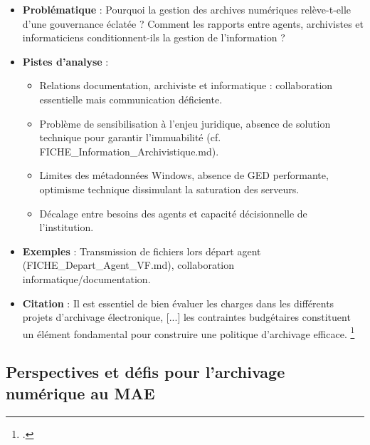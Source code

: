 \begin{itemize}
	\item \textbf{Problématique} : Pourquoi la gestion des archives numériques relève-t-elle d’une gouvernance éclatée ? Comment les rapports entre agents, archivistes et informaticiens conditionnent-ils la gestion de l’information ?
	\item \textbf{Pistes d’analyse} :
	\begin{itemize}
		\item Relations documentation, archiviste et informatique : collaboration essentielle mais communication déficiente.
		\item Problème de sensibilisation à l’enjeu juridique, absence de solution technique pour garantir l’immuabilité (cf. FICHE\_Information\_Archivistique.md).
		\item Limites des métadonnées Windows, absence de GED performante, optimisme technique dissimulant la saturation des serveurs.
		\item Décalage entre besoins des agents et capacité décisionnelle de l’institution.
	\end{itemize}
	\item \textbf{Exemples} : Transmission de fichiers lors départ agent (FICHE\_Depart\_Agent\_VF.md), collaboration informatique/documentation.
	\item \textbf{Citation} : \og Il est essentiel de bien évaluer les charges dans les différents projets d’archivage électronique, [...] les contraintes budgétaires constituent un élément fondamental pour construire une politique d’archivage efficace. \fg \footcite{bechardArchivesElectroniques2020a}
\end{itemize}

\subsection{Perspectives et défis pour l’archivage numérique au MAE}

